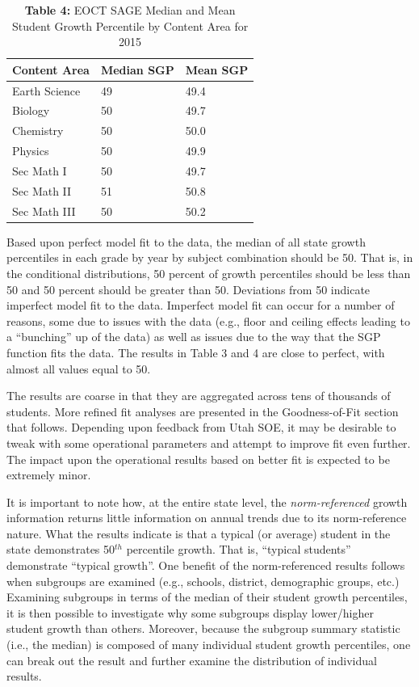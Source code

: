 \documentclass[12pt]{article}
\begin{document}
\begin{table}[H]
\caption*{\textbf{Table 4:} EOCT SAGE Median and Mean Student Growth Percentile by Content Area for 2015\label{}} 
\begin{center}
\begin{tabular}{lll}
\hline\hline
\multicolumn{1}{c}{Content Area}&\multicolumn{1}{c}{Median SGP}&\multicolumn{1}{c}{Mean SGP}\tabularnewline
\hline
Earth Science&49&49.4\tabularnewline
Biology&50&49.7\tabularnewline
Chemistry&50&50.0\tabularnewline
Physics&50&49.9\tabularnewline
Sec Math I&50&49.7\tabularnewline
Sec Math II&51&50.8\tabularnewline
Sec Math III&50&50.2\tabularnewline
\hline
\end{tabular}\end{center}

\end{table}

Based upon perfect model fit to the data, the median of all state growth
percentiles in each grade by year by subject combination should be 50.
That is, in the conditional distributions, 50 percent of growth
percentiles should be less than 50 and 50 percent should be greater than
50. Deviations from 50 indicate imperfect model fit to the data.
Imperfect model fit can occur for a number of reasons, some due to
issues with the data (e.g., floor and ceiling effects leading to a
``bunching'' up of the data) as well as issues due to the way that the
SGP function fits the data. The results in Table 3 and 4 are close to
perfect, with almost all values equal to 50.

The results are coarse in that they are aggregated across tens of
thousands of students. More refined fit analyses are presented in the
Goodness-of-Fit section that follows. Depending upon feedback from Utah
SOE, it may be desirable to tweak with some operational parameters and
attempt to improve fit even further. The impact upon the operational
results based on better fit is expected to be extremely minor.

It is important to note how, at the entire state level, the
\emph{norm-referenced} growth information returns little information on
annual trends due to its norm-reference nature. What the results
indicate is that a typical (or average) student in the state
demonstrates 50\(^{th}\) percentile growth. That is, ``typical
students'' demonstrate ``typical growth''. One benefit of the
norm-referenced results follows when subgroups are examined (e.g.,
schools, district, demographic groups, etc.) Examining subgroups in
terms of the median of their student growth percentiles, it is then
possible to investigate why some subgroups display lower/higher student
growth than others. Moreover, because the subgroup summary statistic
(i.e., the median) is composed of many individual student growth
percentiles, one can break out the result and further examine the
distribution of individual results.
\end{document}
